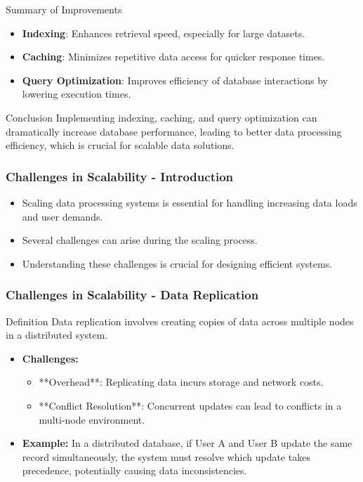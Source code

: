 \documentclass[aspectratio=169]{beamer}
\begin{document}
\begin{frame}[fragile]{Summary of Improvements}
    \begin{itemize}
        \item \textbf{Indexing}: Enhances retrieval speed, especially for large datasets.
        \item \textbf{Caching}: Minimizes repetitive data access for quicker response times.
        \item \textbf{Query Optimization}: Improves efficiency of database interactions by lowering execution times.
    \end{itemize}
\end{frame}

\begin{frame}[fragile]{Conclusion}
    Implementing indexing, caching, and query optimization can dramatically increase database performance, leading to better data processing efficiency, which is crucial for scalable data solutions.
\end{frame}

\begin{frame}[fragile]
    \frametitle{Challenges in Scalability - Introduction}
    \begin{itemize}
        \item Scaling data processing systems is essential for handling increasing data loads and user demands.
        \item Several challenges can arise during the scaling process.
        \item Understanding these challenges is crucial for designing efficient systems.
    \end{itemize}
\end{frame}

\begin{frame}[fragile]
    \frametitle{Challenges in Scalability - Data Replication}
    \begin{block}{Definition}
        Data replication involves creating copies of data across multiple nodes in a distributed system.
    \end{block}
    \begin{itemize}
        \item \textbf{Challenges:}
        \begin{itemize}
            \item **Overhead**: Replicating data incurs storage and network costs.
            \item **Conflict Resolution**: Concurrent updates can lead to conflicts in a multi-node environment.
        \end{itemize}
        \item \textbf{Example:} 
            In a distributed database, if User A and User B update the same record simultaneously, the system must resolve which update takes precedence, potentially causing data inconsistencies.
    \end{itemize}
\end{frame}
\end{document}
